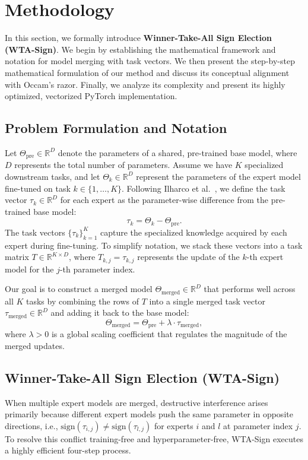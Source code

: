\section{Methodology}
\label{submission:method}

In this section, we formally introduce \textbf{\mbox{Winner-Take-All} Sign Election (WTA-Sign)}.
We begin by establishing the mathematical framework and notation for model merging with task vectors.
We then present the step-by-step mathematical formulation of our method and discuss its conceptual alignment with Occam's razor.
Finally, we analyze its complexity and present its highly optimized, vectorized PyTorch implementation.

\subsection{Problem Formulation and Notation}
Let $\Theta_{\text{pre}} \in \mathbb{R}^D$ denote the parameters of a shared, pre-trained base model, where $D$ represents the total number of parameters.
Assume we have $K$ specialized downstream tasks, and let $\Theta_k \in \mathbb{R}^D$ represent the parameters of the expert model fine-tuned on task $k \in \{1, \ldots, K\}$.
Following Ilharco et al.~\cite{ilharco2022editing}, we define the task vector $\tau_k \in \mathbb{R}^D$ for each expert as the parameter-wise difference from the pre-trained base model:
\begin{equation}
    \tau_k = \Theta_k - \Theta_{\text{pre}}.
\end{equation}
The task vectors $\{\tau_k\}_{k=1}^K$ capture the specialized knowledge acquired by each expert during fine-tuning.
To simplify notation, we stack these vectors into a task matrix $T \in \mathbb{R}^{K \times D}$, where $T_{k, j} = \tau_{k, j}$ represents the update of the $k$-th expert model for the $j$-th parameter index.

Our goal is to construct a merged model $\Theta_{\text{merged}} \in \mathbb{R}^D$ that performs well across all $K$ tasks by combining the rows of $T$ into a single merged task vector $\tau_{\text{merged}} \in \mathbb{R}^D$ and adding it back to the base model:
\begin{equation}
    \Theta_{\text{merged}} = \Theta_{\text{pre}} + \lambda \cdot \tau_{\text{merged}},
\end{equation}
where $\lambda > 0$ is a global scaling coefficient that regulates the magnitude of the merged updates.

\subsection{Winner-Take-All Sign Election (WTA-Sign)}
When multiple expert models are merged, destructive interference arises primarily because different expert models push the same parameter in opposite directions, i.e., $\text{sign}(\tau_{i, j}) \neq \text{sign}(\tau_{l, j})$ for experts $i$ and $l$ at parameter index $j$.
To resolve this conflict training-free and hyperparameter-free, WTA-Sign executes a highly efficient four-step process.

